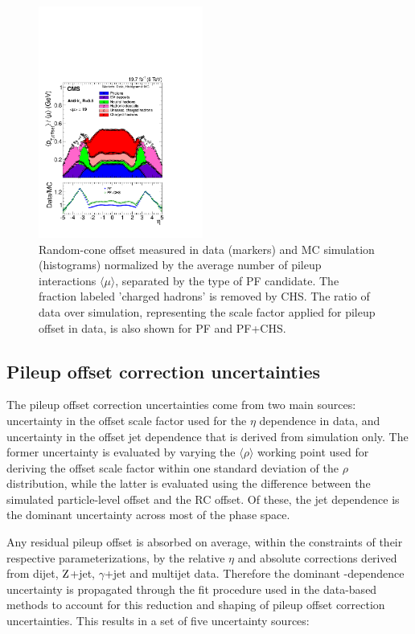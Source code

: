 \documentclass[11pt,twoside,a4paper,cmspaper,final,collab]{cms-tdr}
\begin{document}
\begin{figure}[htbp!]
\centering
\includegraphics[width=0.48\textwidth]{Figure_007.pdf}
\caption{\label{fig:l1data}
Random-cone offset measured in data (markers) and MC simulation (histograms) normalized by the average number of pileup interactions $\langle\mu\rangle$, separated by the type of PF candidate. The fraction labeled 'charged hadrons' is removed by CHS. The ratio of data over simulation, representing the scale factor applied for pileup offset in data, is also shown for PF and PF+CHS.
}
\end{figure}

\subsection{Pileup offset correction uncertainties}\label{sec:l1uncert}

The pileup offset correction uncertainties come from two main sources: uncertainty in the offset scale factor used for the $\eta$ dependence in data, and uncertainty in the offset jet \pt dependence that is derived from simulation only. The former uncertainty is evaluated by varying the $\langle\rho\rangle$ working point used for deriving the offset scale factor within one standard deviation of the $\rho$ distribution, while the latter is evaluated using the difference between the simulated particle-level offset and the RC offset. Of these, the jet \pt dependence is the dominant uncertainty across most of the phase space.

Any residual pileup offset is absorbed on average, within the constraints of their respective parameterizations, by the relative $\eta$ and absolute \pt corrections derived from dijet, $\mathrm{Z}$+jet, $\gamma$+jet and multijet data. Therefore the dominant \pt-dependence uncertainty is propagated through the fit procedure used in the data-based methods to account for this reduction and shaping of pileup offset correction uncertainties. This results in a set of five uncertainty sources:
\end{document}

